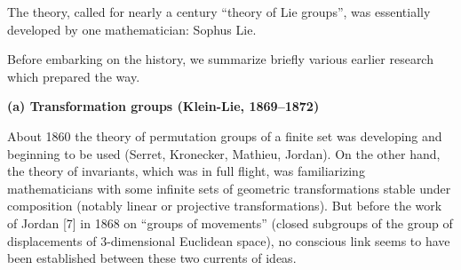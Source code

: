 
The theory, called for nearly a century ``theory of Lie groups'', was essentially developed by one mathematician: Sophus Lie.

Before embarking on the history, we summarize briefly various earlier research which prepared the way.

\textbf{(a) Transformation groups (Klein-Lie, 1869--1872)}

About 1860 the theory of permutation groups of a finite set was developing and beginning to be used (Serret, Kronecker, Mathieu, Jordan). On the other hand, the theory of invariants, which was in full flight, was familiarizing mathematicians with some infinite sets of geometric transformations stable under composition (notably linear or projective transformations). But before the work of Jordan {[}7{]} in 1868 on ``groups of movements'' (closed subgroups of the group of displacements of 3-dimensional Euclidean space), no conscious link seems to have been established between these two currents of ideas.

